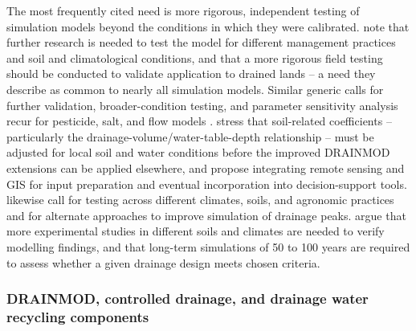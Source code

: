 The most frequently cited need is more rigorous, independent testing of
simulation models beyond the conditions in which they were calibrated.
\textcite{Youssef2006} note that further research is needed to test the model for
different management practices and soil and climatological conditions, and that a
more rigorous field testing should be conducted to validate application to
drained lands -- a need they describe as common to nearly all simulation models.
Similar generic calls for further validation, broader-condition testing, and
parameter sensitivity analysis recur for pesticide, salt, and flow models
\parencite{Branger2009,Hirekhan2007,Yang2008b,Xian2017}. \textcite{Yang2008b}
stress that soil-related coefficients -- particularly the drainage-volume/water-table-depth
relationship -- must be adjusted for local soil and water conditions before the
improved DRAINMOD extensions can be applied elsewhere, and propose integrating
remote sensing and GIS for input preparation and eventual incorporation into
decision-support tools. \textcite{Xian2017} likewise call for testing across
different climates, soils, and agronomic practices and for alternate approaches
to improve simulation of drainage peaks. \textcite{Mendez2004} argue that more
experimental studies in different soils and climates are needed to verify
modelling findings, and that long-term simulations of 50 to 100 years are
required to assess whether a given drainage design meets chosen criteria.

\subsubsection{DRAINMOD, controlled drainage, and drainage water recycling components}

